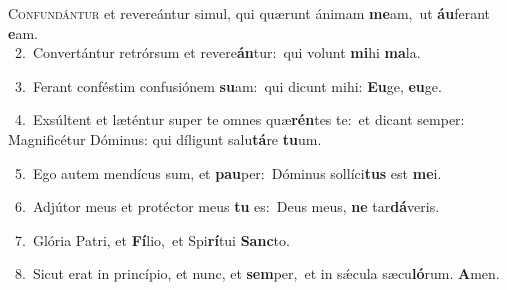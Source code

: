 \lettrine{\initial\textcolor{\initialcolor}{C}}{onfundántur} et revereántur simul, qui quærunt ánimam \textbf{me}\-am,~\star ut \textbf{áu}\-ferant \textbf{e}\-am.\\
{\numbfont\textcolor{\numbcolor}{~2.}}~Convertántur retrórsum et revere\-\textbf{án}\-tur:~\star qui volunt \textbf{mi}\-hi \textbf{ma}\-la.\par
{\numbfont\textcolor{\numbcolor}{~3.}}~Ferant conféstim confusiónem \textbf{su}\-am:~\star qui dicunt mihi: \textbf{Eu}\-ge, \textbf{eu}\-ge.\par
{\numbfont\textcolor{\numbcolor}{~4.}}~Exsúltent et læténtur super te omnes quæ\-\textbf{rén}\-tes te:~\star et dicant semper: Magnificétur Dóminus: qui díligunt salu\-\textbf{tá}\-re \textbf{tu}\-um.\par
{\numbfont\textcolor{\numbcolor}{~5.}}~Ego autem mendícus sum, et \textbf{pau}\-per:~\star Dóminus sollíci\textbf{tus} est \textbf{me}\-i.\par
{\numbfont\textcolor{\numbcolor}{~6.}}~Adjútor meus et protéctor meus \textbf{tu} es:~\star Deus meus, \textbf{ne} tar\-\textbf{dá}\-veris.\par
{\numbfont\textcolor{\numbcolor}{~7.}}~Glória Patri, et \textbf{Fí}\-lio,~\star et Spi\-\textbf{rí}\-tui \textbf{Sanc}\-to.\par
{\numbfont\textcolor{\numbcolor}{~8.}}~Sicut erat in princípio, et nunc, et \textbf{sem}\-per,~\star et in sǽcula sæcu\-\textbf{ló}\-rum. \textbf{A}\-men.\par

